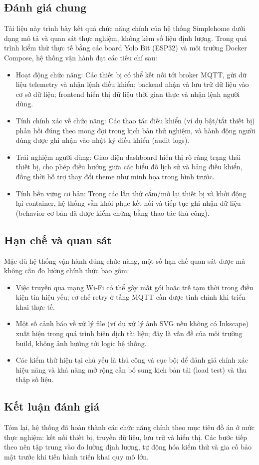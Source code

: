 \subsection{Đánh giá chung}
Tài liệu này trình bày kết quả chức năng chính của hệ thống Simplehome dưới dạng mô tả và quan sát thực nghiệm, không kèm số liệu định lượng. Trong quá trình kiểm thử thực tế bằng các board Yolo Bit (ESP32) và môi trường Docker Compose, hệ thống vận hành đạt các tiêu chí sau:
\begin{itemize}
    \item Hoạt động chức năng: Các thiết bị có thể kết nối tới broker MQTT, gửi dữ liệu telemetry và nhận lệnh điều khiển; backend nhận và lưu trữ dữ liệu vào cơ sở dữ liệu; frontend hiển thị dữ liệu thời gian thực và nhận lệnh người dùng.
    \item Tính chính xác về chức năng: Các thao tác điều khiển (ví dụ bật/tắt thiết bị) phản hồi đúng theo mong đợi trong kịch bản thử nghiệm, và hành động người dùng được ghi nhận vào nhật ký điều khiển (audit logs).
    \item Trải nghiệm người dùng: Giao diện dashboard hiển thị rõ ràng trạng thái thiết bị, cho phép điều hướng giữa các biểu đồ lịch sử và bảng điều khiển, đồng thời hỗ trợ thay đổi theme như minh họa trong hình trước.
    \item Tính bền vững cơ bản: Trong các lần thử cắm/mở lại thiết bị và khởi động lại container, hệ thống vẫn khôi phục kết nối và tiếp tục ghi nhận dữ liệu (behavior cơ bản đã được kiểm chứng bằng thao tác thủ công).
\end{itemize}

\subsection{Hạn chế và quan sát}
Mặc dù hệ thống vận hành đúng chức năng, một số hạn chế quan sát được mà không cần đo lường chính thức bao gồm:
\begin{itemize}
    \item Việc truyền qua mạng Wi‑Fi có thể gây mất gói hoặc trễ tạm thời trong điều kiện tín hiệu yếu; cơ chế retry ở tầng MQTT cần được tinh chỉnh khi triển khai thực tế.
    \item Một số cảnh báo về xử lý file (ví dụ xử lý ảnh SVG nếu không có Inkscape) xuất hiện trong quá trình biên dịch tài liệu; đây là vấn đề của môi trường build, không ảnh hưởng tới logic hệ thống.
    \item Các kiểm thử hiện tại chủ yếu là thủ công và cục bộ; để đánh giá chính xác hiệu năng và khả năng mở rộng cần bổ sung kịch bản tải (load test) và thu thập số liệu.
\end{itemize}

\subsection{Kết luận đánh giá}
Tóm lại, hệ thống đã hoàn thành các chức năng chính theo mục tiêu đồ án ở mức thực nghiệm: kết nối thiết bị, truyền dữ liệu, lưu trữ và hiển thị. Các bước tiếp theo nên tập trung vào đo lường định lượng, tự động hóa kiểm thử và gia cố bảo mật trước khi tiến hành triển khai quy mô lớn.
